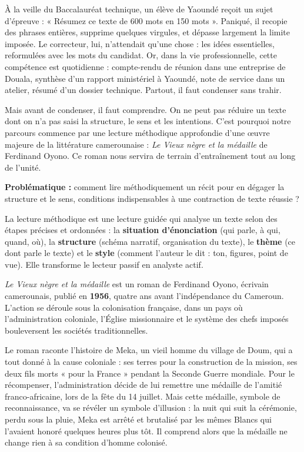 \documentclass[11pt]{article}
\newcommand{\cle}[1]{{\popxbold\color{popdark}#1}}
\newcounter{popsec}
\newcounter{popsub}
\newcommand{\courssub}[1]{%
  \stepcounter{popsub}%
  \par\vspace{9pt}\noindent{\popxbold\fontsize{11.5}{13}\selectfont\color{popink}{\color{poporange}\thepopsec.\thepopsub}\hspace{6pt}#1}\par\nopagebreak\vspace{4pt}
}
\begin{document}
À la veille du Baccalauréat technique, un élève de Yaoundé reçoit un sujet d'épreuve : « Résumez ce texte de 600 mots en 150 mots ». Paniqué, il recopie des phrases entières, supprime quelques virgules, et dépasse largement la limite imposée. Le correcteur, lui, n'attendait qu'une chose : les \cle{idées essentielles}, reformulées avec les mots du candidat. Or, dans la vie professionnelle, cette compétence est quotidienne : compte-rendu de réunion dans une entreprise de Douala, synthèse d'un rapport ministériel à Yaoundé, note de service dans un atelier, résumé d'un dossier technique. Partout, il faut condenser sans trahir.

Mais avant de condenser, il faut \cle{comprendre}. On ne peut pas réduire un texte dont on n'a pas saisi la structure, le sens et les intentions. C'est pourquoi notre parcours commence par une lecture méthodique approfondie d'une œuvre majeure de la littérature camerounaise : \emph{Le Vieux nègre et la médaille} de Ferdinand Oyono. Ce roman nous servira de terrain d'entraînement tout au long de l'unité.

\textbf{Problématique :} comment lire méthodiquement un récit pour en dégager la structure et le sens, conditions indispensables à une contraction de texte réussie ?

\courssub{Présentation de l'œuvre et de son auteur}

\begin{definition}
La \cle{lecture méthodique} est une lecture guidée qui analyse un texte selon des étapes précises et ordonnées : la \textbf{situation d'énonciation} (qui parle, à qui, quand, où), la \textbf{structure} (schéma narratif, organisation du texte), le \textbf{thème} (ce dont parle le texte) et le \textbf{style} (comment l'auteur le dit : ton, figures, point de vue). Elle transforme le lecteur passif en analyste actif.
\end{definition}

\emph{Le Vieux nègre et la médaille} est un roman de \cle{Ferdinand Oyono}, écrivain camerounais, publié en \textbf{1956}, quatre ans avant l'indépendance du Cameroun. L'action se déroule sous la \cle{colonisation française}, dans un pays où l'administration coloniale, l'Église missionnaire et le système des chefs imposés bouleversent les sociétés traditionnelles.

Le roman raconte l'histoire de \cle{Meka}, un vieil homme du village de Doum, qui a tout donné à la cause coloniale : ses terres pour la construction de la mission, ses deux fils morts « pour la France » pendant la Seconde Guerre mondiale. Pour le récompenser, l'administration décide de lui remettre une \cle{médaille} de l'amitié franco-africaine, lors de la fête du 14 juillet. Mais cette médaille, symbole de reconnaissance, va se révéler un symbole d'illusion : la nuit qui suit la cérémonie, perdu sous la pluie, Meka est arrêté et brutalisé par les mêmes Blancs qui l'avaient honoré quelques heures plus tôt. Il comprend alors que la médaille ne change rien à sa condition d'homme colonisé.
\end{document}
